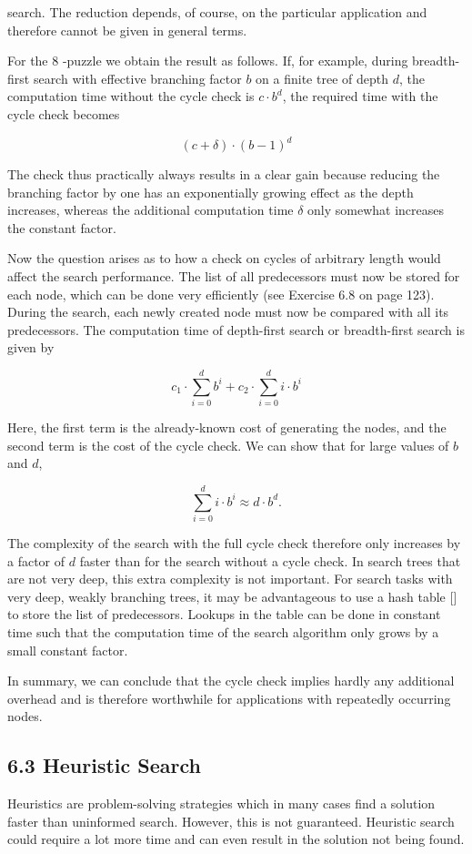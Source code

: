 \documentclass[10pt]{article}
\begin{document}
search. The reduction depends, of course, on the particular application and therefore cannot be given in general terms.


For the 8 -puzzle we obtain the result as follows. If, for example, during breadth-first search with effective branching factor $b$ on a finite tree of depth $d$, the computation time without the cycle check is $c \cdot b^{d}$, the required time with the cycle check becomes

$$
(c+\delta) \cdot(b-1)^{d}
$$

The check thus practically always results in a clear gain because reducing the branching factor by one has an exponentially growing effect as the depth increases, whereas the additional computation time $\delta$ only somewhat increases the constant factor.

Now the question arises as to how a check on cycles of arbitrary length would affect the search performance. The list of all predecessors must now be stored for each node, which can be done very efficiently (see Exercise 6.8 on page 123). During the search, each newly created node must now be compared with all its predecessors. The computation time of depth-first search or breadth-first search is given by

$$
c_{1} \cdot \sum_{i=0}^{d} b^{i}+c_{2} \cdot \sum_{i=0}^{d} i \cdot b^{i}
$$

Here, the first term is the already-known cost of generating the nodes, and the second term is the cost of the cycle check. We can show that for large values of $b$ and $d$,

$$
\sum_{i=0}^{d} i \cdot b^{i} \approx d \cdot b^{d} .
$$

The complexity of the search with the full cycle check therefore only increases by a factor of $d$ faster than for the search without a cycle check. In search trees that are not very deep, this extra complexity is not important. For search tasks with very deep, weakly branching trees, it may be advantageous to use a hash table [\cite{cormen1990introduction}] to store the list of predecessors. Lookups in the table can be done in constant time such that the computation time of the search algorithm only grows by a small constant factor.

In summary, we can conclude that the cycle check implies hardly any additional overhead and is therefore worthwhile for applications with repeatedly occurring nodes.

\subsection*{6.3 Heuristic Search}
Heuristics are problem-solving strategies which in many cases find a solution faster than uninformed search. However, this is not guaranteed. Heuristic search could require a lot more time and can even result in the solution not being found.
\end{document}
